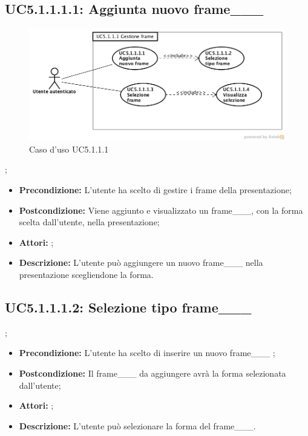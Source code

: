 \subsection{ UC5.1.1.1.1: Aggiunta nuovo frame___}

\begin{figure}[h]
	\begin{center}
	\includegraphics[scale=0.4]{diagram/UC5-1-1-1.png}
	\caption{Caso d'uso UC5.1.1.1}
	\end{center}
\end{figure};
\begin{itemize}
	\item \textbf{Precondizione:} L'utente ha scelto di gestire i frame della presentazione;
	\item \textbf{Postcondizione:} Viene aggiunto e visualizzato un frame___, con la forma scelta dall'utente, nella presentazione;
	\item \textbf{Attori:} ;
	\item \textbf{Descrizione:} L'utente può aggiungere un nuovo frame___ nella presentazione scegliendone la forma.
\end{itemize}
\subsection{ UC5.1.1.1.2: Selezione tipo frame___ }
;
\begin{itemize}
	\item \textbf{Precondizione:} L'utente ha scelto di inserire un nuovo frame___ ;
	\item \textbf{Postcondizione:} Il frame___ da aggiungere avrà la forma selezionata dall'utente;
	\item \textbf{Attori:} ;
	\item \textbf{Descrizione:} L'utente può selezionare la forma del frame___.
\end{itemize}
